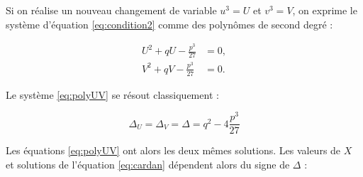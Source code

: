 Si on réalise un nouveau changement de variable $u^3 = U$ et $v^3 = V$, on exprime le système d'équation \ref{eq:condition2} comme des polynômes de second degré : 

\begin{subequations}\label{eq:polyUV}
\begin{align}
U^2+qU-\frac{p^3}{27} &= 0,\\
V^2+qV-\frac{p^3}{27} &= 0.
\end{align}
\end{subequations}

Le système \ref{eq:polyUV} se résout classiquement : 

\begin{equation}
\Delta_U = \Delta_V = \Delta = q^2-4\frac{p^3}{27}
\end{equation}

Les équations \ref{eq:polyUV} ont alors les deux mêmes solutions. Les valeurs de $X$ et solutions de l'équation \ref{eq:cardan} dépendent alors du signe de $\Delta$ : 

